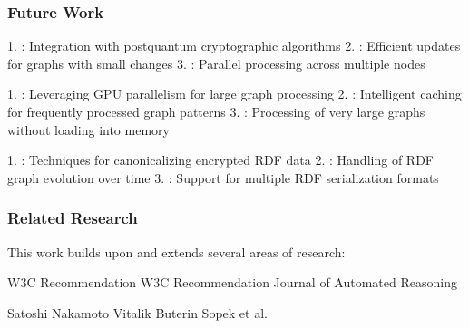 \documentclass[letterpaper,10pt,english]{sphinxmanual}
\begin{document}
\subsubsection{Future Work}
\label{\detokenize{research/rdf-canonicalization-algorithm:future-work}}
\sphinxAtStartPar
{}
1. : Integration with post\sphinxhyphen{}quantum cryptographic algorithms
2. : Efficient updates for graphs with small changes
3. : Parallel processing across multiple nodes

\sphinxAtStartPar
{}
1. : Leveraging GPU parallelism for large graph processing
2. : Intelligent caching for frequently processed graph patterns
3. : Processing of very large graphs without loading into memory

\sphinxAtStartPar
{}
1. : Techniques for canonicalizing encrypted RDF data
2. : Handling of RDF graph evolution over time
3. : Support for multiple RDF serialization formats


\subsubsection{Related Research}
\label{\detokenize{research/rdf-canonicalization-algorithm:related-research}}
\sphinxAtStartPar
This work builds upon and extends several areas of research:

\sphinxAtStartPar
{}
\sphinxhyphen{}  \sphinxhyphen{} W3C Recommendation
\sphinxhyphen{}  \sphinxhyphen{} W3C Recommendation
\sphinxhyphen{}  \sphinxhyphen{} Journal of Automated Reasoning

\sphinxAtStartPar
{}
\sphinxhyphen{}  \sphinxhyphen{} Satoshi Nakamoto
\sphinxhyphen{}  \sphinxhyphen{} Vitalik Buterin
\sphinxhyphen{}  \sphinxhyphen{} Sopek et al.
\end{document}
